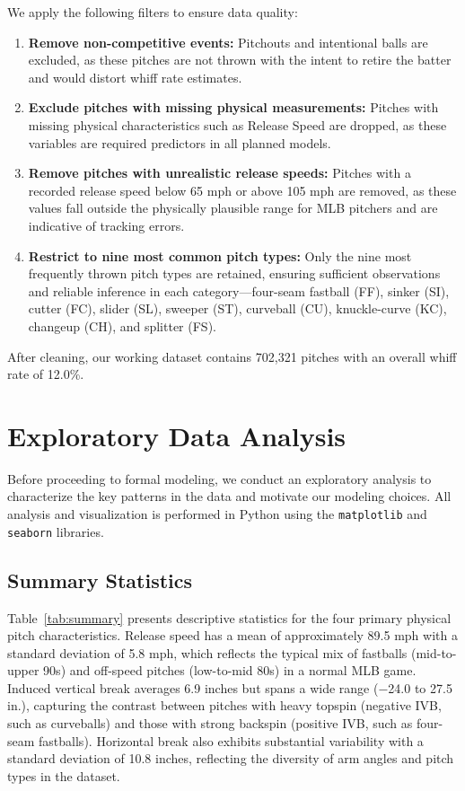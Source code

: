\documentclass[11pt]{article}
\newcommand{\totalPitches}{702{,}321}    %
\newcommand{\overallWhiff}{12.0}         %
\begin{document}
We apply the following filters to ensure data quality:
\begin{enumerate}[nosep]
    \item \textbf{Remove non-competitive events:} Pitchouts and intentional balls are excluded, as these pitches are not thrown with the intent to retire the batter and would distort whiff rate estimates.
    \item \textbf{Exclude pitches with missing physical measurements:} Pitches with missing physical characteristics such as Release Speed are dropped, as these variables are required predictors in all planned models. 
    \item \textbf{Remove pitches with unrealistic release speeds:} Pitches with a recorded release speed below 65 mph or above 105 mph are removed, as these values fall outside the physically plausible range for MLB pitchers and are indicative of tracking errors.
    \item \textbf{Restrict to nine most common pitch types:} Only the nine most frequently thrown pitch types are retained, ensuring sufficient observations and reliable inference in each category---four-seam fastball (FF), sinker (SI), cutter (FC), slider (SL), sweeper (ST), curveball (CU), knuckle-curve (KC), changeup (CH), and splitter (FS).
\end{enumerate}
After cleaning, our working dataset contains \totalPitches{} pitches with an overall whiff rate of \overallWhiff\%.

\section{Exploratory Data Analysis}

Before proceeding to formal modeling, we conduct an exploratory analysis to characterize the key patterns in the data and motivate our modeling choices.
All analysis and visualization is performed in Python using the \texttt{matplotlib} \citep{matplotlib2007} and \texttt{seaborn} \citep{seaborn2021} libraries.

\subsection{Summary Statistics}

Table~\ref{tab:summary} presents descriptive statistics for the four primary physical pitch characteristics.
Release speed has a mean of approximately 89.5 mph with a standard deviation of 5.8 mph, which reflects the typical mix of fastballs (mid-to-upper 90s) and off-speed pitches (low-to-mid 80s) in a normal MLB game.
Induced vertical break averages 6.9 inches but spans a wide range ($-$24.0 to 27.5 in.), capturing the contrast between pitches with heavy topspin (negative IVB, such as curveballs) and those with strong backspin (positive IVB, such as four-seam fastballs).
Horizontal break also exhibits substantial variability with a standard deviation of 10.8 inches, reflecting the diversity of arm angles and pitch types in the dataset.
\end{document}
